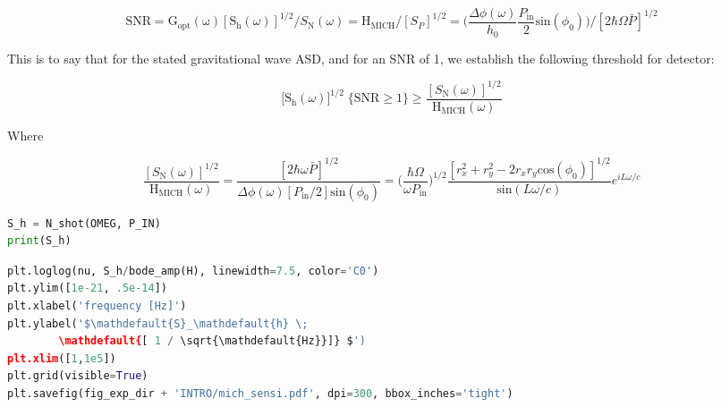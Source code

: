 \begin{equation}\mathrm{SNR} = \mathrm{G_{opt}(\omega)} [\mathrm{S}_{\mathrm{h}}(\omega)]^{1/2} / S_\mathrm{N}(\omega) = \mathrm{H}_\mathrm{MICH} / [S_P]^{1/2} = \bigg( \frac{\Delta \phi(\omega)}{h_0} \frac{P_\mathrm{in}}{2}\mathrm{sin}(\phi_0) \bigg) \bigg/ [2 \hbar \Omega \bar{P}]^{1/2}\end{equation}

\noindent This is to say that for the stated gravitational wave ASD, and for an
SNR of 1, we establish the following threshold for detector:

\begin{equation}\big[ \mathrm{S}_{\mathrm{h}}(\omega) \big]^{1/2} \; \{\mathrm{SNR}\geq1\} \geq \frac{ [S_\mathrm{N}(\omega)]^{1/2}}{\mathrm{H}_\mathrm{MICH}(\omega)}\end{equation}

\noindent Where

\begin{equation}\frac{ [S_\mathrm{N}(\omega)]^{1/2}}{\mathrm{H}_\mathrm{MICH}(\omega)} = \frac{[2 \hbar \omega \bar{P}]^{1/2}}{ \Delta \phi(\omega) [P_\mathrm{in} / 2]  \mathrm{sin}(\phi_0)} = \bigg( \frac{\hbar \Omega }{\omega P_\mathrm{in}} \bigg)^{1/2} \frac{[r_x^2 + r_y^2 -  2r_x r_y\mathrm{cos}(\phi_0)]^{1/2}}{\mathrm{sin}(L \omega / c)} e^{iL \omega / c}\end{equation}

\begin{spacing}{1.2} \begin{lstlisting}[frame=single, language=Python]
S_h = N_shot(OMEG, P_IN) 
print(S_h)
\end{lstlisting} \end{spacing}

\begin{spacing}{1.2} \begin{lstlisting}[frame=single, language=Python]
plt.loglog(nu, S_h/bode_amp(H), linewidth=7.5, color='C0')
plt.ylim([1e-21, .5e-14])
plt.xlabel('frequency [Hz]')
plt.ylabel('$\mathdefault{S}_\mathdefault{h} \;  
	    \mathdefault{[ 1 / \sqrt{\mathdefault{Hz}}]} $')
plt.xlim([1,1e5])
plt.grid(visible=True)
plt.savefig(fig_exp_dir + 'INTRO/mich_sensi.pdf', dpi=300, bbox_inches='tight')
\end{lstlisting} \end{spacing}

